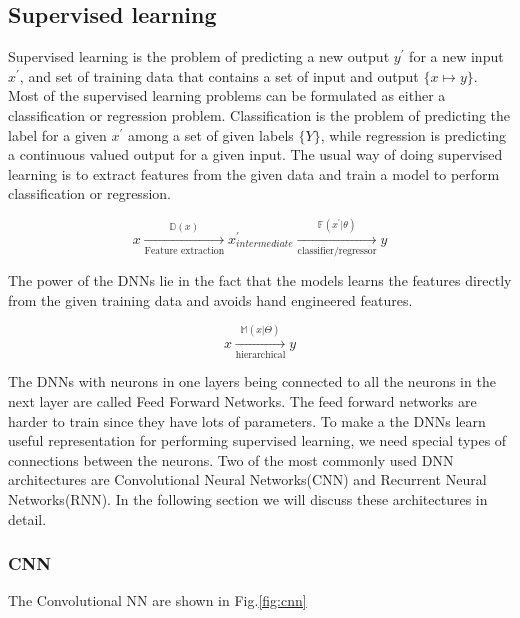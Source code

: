 \documentclass[a4paper]{article}
\begin{document}
\subsection{Supervised  learning}

Supervised  learning is the problem of predicting a new  output $y^\prime$ for a
new input $x^\prime$, and set of  training data that contains a set of input and
output  $\{x  \mapsto y\}$.  Most  of the supervised  learning problems  can  be
formulated as either a classification or  regression  problem. Classification is
the problem of predicting the label for a given $x^\prime$  among a set of given
labels $\{Y\}$, while  regression is predicting a continuous valued output for a
given input. The usual way of doing  supervised learning is to extract  features
from the given data and train a model to perform classification or regression.


\begin{equation*}
  x
  \xrightarrow[\text{Feature extraction}]{
    \mathbb{D}(x)
  }
  x^\prime
  _{intermediate}
  \xrightarrow[\text{classifier/regressor}]{
    \mathbb{F}(x^\prime | \theta)
  }
  y
\end{equation*}


The  power of the  DNNs lie in  the fact  that the  models learns  the  features
directly from the given training data and avoids hand  engineered features.


\begin{equation*}
  x \xrightarrow[ \text{hierarchical}] { \mathbb{M}(x | \Theta) } y
\end{equation*}


The DNNs  with neurons in one  layers being connected to all the neurons  in the
next  layer  are  called  Feed Forward Networks. The feed  forward networks  are
harder  to train since  they have lots  of parameters. To make  a the DNNs learn
useful representation for performing supervised learning,  we need special types
of  connections  between  the  neurons.  Two  of  the  most  commonly  used  DNN
architectures  are  Convolutional  Neural  Networks(CNN)  and  Recurrent  Neural
Networks(RNN). In the following section  we  will discuss these architectures in
detail.


\subsubsection{CNN}
The Convolutional NN are shown in Fig.\ref{fig:cnn}
\end{document}
